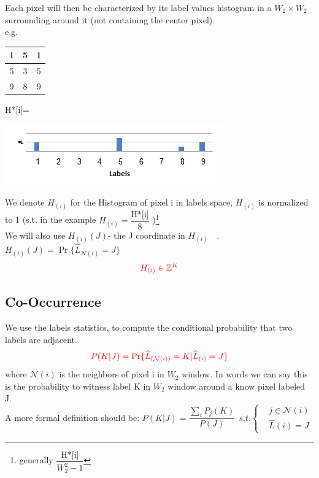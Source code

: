 \documentclass{article}
\begin{document}
Each pixel will then be characterized by its label values histogram in a $W_2\times W_2$ surrounding around it (not containing the center pixel).\\
e.g. 
\begin{multicols}{3}
\begin{tabular}{|c|c|c|}\hline
1&5&1\\	\hline
5&\colorbox{lightred}{3}&5\\ \hline
9&8&9\\ \hline
\end{tabular}

\begin{flushright}
	H*[i]=
\end{flushright}	
\includegraphics[width=1.2\linewidth]{histogram.png}
\end{multicols}
We denote $ H_{(i)} $ for the Histogram of pixel i in labels space, $ H_{(i)} $  is normalized to 1 (s.t. in the example $ H_{(i)} = \dfrac{\text{H*[i]}}{8}$ )\footnote{generally $\dfrac{\text{H*[i]}}{W_2^2-1}$ }\\
We will also use  $ H_{(i)}(J) $- the J coordinate in $ H_{(i)} \quad $. $ H_{(i)}(J)=\Pr \{\widehat{L}_{\mathcal{N}(i)}=J \} $
\begin{equation*}
\color{red} H_{(i)}\in \mathbb{Z}^K 
\end{equation*}

\subsection{Co-Occurrence}
We use the labels statistics, to compute the conditional probability that two labels are adjacent.
$$ \color{red}
 P(K|J)=\Pr\{ \widehat{L}_{(\mathcal{N}(i))}=K|\widehat{L}_{(i)}=J \}
$$
where $ \mathcal{N}(i) $ is the neighbors of pixel i in $ W_2 $ window.
In words we can say this is the probability to witness label K in $ W_2 $ window around a know pixel labeled J.\\
A more formal definition should be:  $ P(K|J)=\dfrac{\sum_{i} P _j(K)}{P(J)} \ \ s.t. \begin{cases}
&j \in {\mathcal{N}(i)}\\
&\widehat{L}(i)=J
\end{cases}  $
\end{document}
